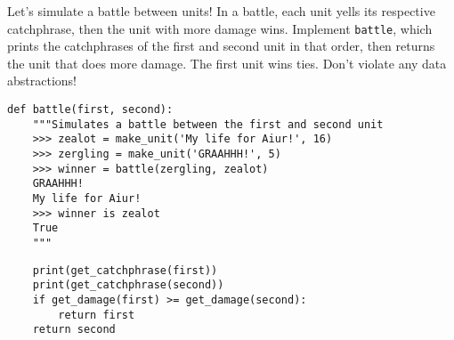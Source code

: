 \question Let's simulate a battle between units! In a battle, each unit yells
its respective catchphrase, then the unit with more damage wins.
Implement {\tt battle}, which prints the catchphrases of the first and
second unit in that order, then returns the unit that does more damage.
The first unit wins ties. Don't violate any data abstractions!

\begin{minipage}{\textwidth}
\begin{lstlisting}
def battle(first, second):
    """Simulates a battle between the first and second unit
    >>> zealot = make_unit('My life for Aiur!', 16)
    >>> zergling = make_unit('GRAAHHH!', 5)
    >>> winner = battle(zergling, zealot)
    GRAAHHH!
    My life for Aiur!
    >>> winner is zealot
    True
    """
\end{lstlisting}
\begin{solution}[2in]
\begin{lstlisting}
    print(get_catchphrase(first))
    print(get_catchphrase(second))
    if get_damage(first) >= get_damage(second):
        return first
    return second
\end{lstlisting}
\end{solution}
\end{minipage}
